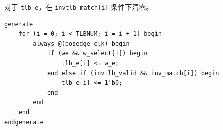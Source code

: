 对于 \verb|tlb_e|，在 \verb|invtlb_match[i]| 条件下清零。

\begin{lstlisting}
generate
    for (i = 0; i < TLBNUM; i = i + 1) begin
        always @(posedge clk) begin
            if (we && w_select[i]) begin
                tlb_e[i] <= w_e;
            end else if (invtlb_valid && inv_match[i]) begin
                tlb_e[i] <= 1'b0;
            end
        end
    end
endgenerate
\end{lstlisting}